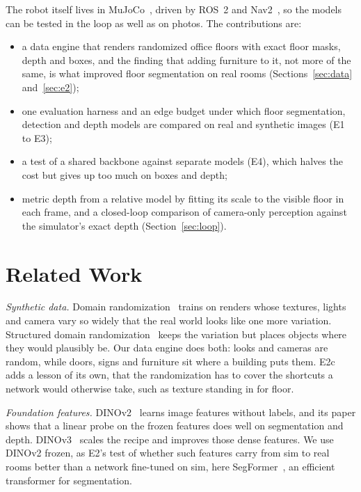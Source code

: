 \documentclass[conference]{IEEEtran}
\begin{document}
The robot itself lives in MuJoCo~\cite{todorov2012mujoco}, driven by ROS~2
and Nav2~\cite{macenski2020marathon}, so the models can be tested in the loop
as well as on photos. The contributions are:
\begin{itemize}
\item a data engine that renders randomized office floors with exact floor
masks, depth and boxes, and the finding that adding furniture to it, not
more of the same, is what improved floor segmentation on real rooms
(Sections~\ref{sec:data} and~\ref{sec:e2});
\item one evaluation harness and an edge budget under which floor
segmentation, detection and depth models are compared on real and
synthetic images (E1 to E3);
\item a test of a shared backbone against separate models (E4), which halves
the cost but gives up too much on boxes and depth;
\item metric depth from a relative model by fitting its scale to the visible
floor in each frame, and a closed-loop comparison of camera-only
perception against the simulator's exact depth
(Section~\ref{sec:loop}).
\end{itemize}

\section{Related Work}

\emph{Synthetic data.} Domain randomization~\cite{tobin2017domain} trains on
renders whose textures, lights and camera vary so widely that the real world
looks like one more variation. Structured domain
randomization~\cite{prakash2019structured} keeps the variation but places
objects where they would plausibly be. Our data engine does both: looks and
cameras are random, while doors, signs and furniture sit where a building
puts them. E2c adds a lesson of its own, that the randomization has to cover
the shortcuts a network would otherwise take, such as texture standing in for
floor.

\emph{Foundation features.} DINOv2~\cite{oquab2023dinov2} learns image
features without labels, and its paper shows that a linear probe on the
frozen features does well on segmentation and depth. DINOv3~\cite{simeoni2025dinov3}
scales the recipe and improves those dense features. We use DINOv2 frozen,
as E2's test of whether such features carry from sim to real rooms better
than a network fine-tuned on sim, here SegFormer~\cite{xie2021segformer}, an
efficient transformer for segmentation.
\end{document}
